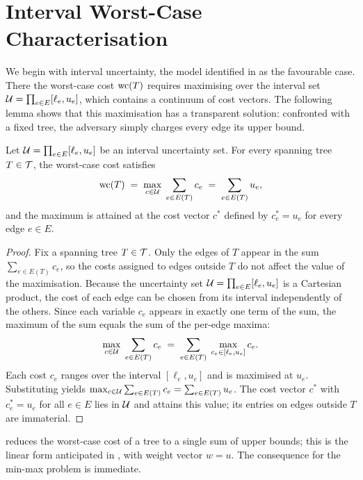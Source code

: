 \section{Interval Worst-Case Characterisation}\label{sec:mm-extremal}

We begin with interval uncertainty, the model identified in  as the favourable case.
There the worst-case cost $\mathrm{wc}(T)$ requires maximising over the interval set $\mathcal{U} = \prod_{e \in E} [\ell_e, u_e]$, which contains a continuum of cost vectors.
The following lemma shows that this maximisation has a transparent solution: confronted with a fixed tree, the adversary simply charges every edge its upper bound.

\begin{lemma}\label{lem:interval-extremal-cost}
Let $\mathcal{U} = \prod_{e \in E} [\ell_e, u_e]$ be an interval uncertainty set.
For every spanning tree $T \in \mathcal{T}$, the worst-case cost satisfies
\[
\mathrm{wc}(T) \;=\; \max_{c \in \mathcal{U}}\; \sum_{e \in E(T)} c_e \;=\; \sum_{e \in E(T)} u_e,
\]
and the maximum is attained at the cost vector $c^{*}$ defined by $c^{*}_e = u_e$ for every edge $e \in E$.
\end{lemma}

\begin{proof}
Fix a spanning tree $T \in \mathcal{T}$.
Only the edges of $T$ appear in the sum $\sum_{e \in E(T)} c_e$, so the costs assigned to edges outside $T$ do not affect the value of the maximisation.
Because the uncertainty set $\mathcal{U} = \prod_{e \in E} [\ell_e, u_e]$ is a Cartesian product, the cost of each edge can be chosen from its interval independently of the others.
Since each variable $c_e$ appears in exactly one term of the sum, the maximum of the sum equals the sum of the per-edge maxima:
\[
\max_{c \in \mathcal{U}}\; \sum_{e \in E(T)} c_e
\;=\; \sum_{e \in E(T)}\; \max_{c_e \in [\ell_e, u_e]} c_e.
\]
Each cost $c_e$ ranges over the interval $[\ell_e, u_e]$ and is maximised at $u_e$.
Substituting yields $\max_{c \in \mathcal{U}} \sum_{e \in E(T)} c_e = \sum_{e \in E(T)} u_e$.
The cost vector $c^{*}$ with $c^{*}_e = u_e$ for all $e \in E$ lies in $\mathcal{U}$ and attains this value; its entries on edges outside $T$ are immaterial.
\end{proof}

 reduces the worst-case cost of a tree to a single sum of upper bounds; this is the linear form anticipated in , with weight vector $w = u$.
The consequence for the min-max problem is immediate.

